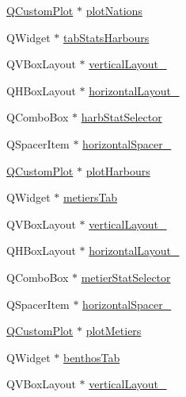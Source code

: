 \begin{DoxyCompactItemize}
\item 
\mbox{\hyperlink{class_q_custom_plot}{Q\+Custom\+Plot}} $\ast$ \mbox{\hyperlink{class_ui___main_window_a8273ab1fbab073c3df732499d91f9a22}{plot\+Nations}}
\item 
Q\+Widget $\ast$ \mbox{\hyperlink{class_ui___main_window_a337762b6a27f6a71e664db0a3bafe255}{tab\+Stats\+Harbours}}
\item 
Q\+V\+Box\+Layout $\ast$ \mbox{\hyperlink{class_ui___main_window_a7b66d5d6ab55f3977317359d09a42345}{vertical\+Layout\+\_}}
\item 
Q\+H\+Box\+Layout $\ast$ \mbox{\hyperlink{class_ui___main_window_a14c9d4842c3e97e16e7873ef0aecdb1e}{horizontal\+Layout\+\_}}
\item 
Q\+Combo\+Box $\ast$ \mbox{\hyperlink{class_ui___main_window_a054dd4b379083e22115ca77a49f6033f}{harb\+Stat\+Selector}}
\item 
Q\+Spacer\+Item $\ast$ \mbox{\hyperlink{class_ui___main_window_a3202b80ffde7629da626c1e0994f63f5}{horizontal\+Spacer\+\_}}
\item 
\mbox{\hyperlink{class_q_custom_plot}{Q\+Custom\+Plot}} $\ast$ \mbox{\hyperlink{class_ui___main_window_a2c53a619aa94f3c1dc10b2515076e2b5}{plot\+Harbours}}
\item 
Q\+Widget $\ast$ \mbox{\hyperlink{class_ui___main_window_a587e2428724df37bed7de8521f5fce51}{metiers\+Tab}}
\item 
Q\+V\+Box\+Layout $\ast$ \mbox{\hyperlink{class_ui___main_window_ab69a0ed5b8ea1148c5dda9b89cdfbba4}{vertical\+Layout\+\_}}
\item 
Q\+H\+Box\+Layout $\ast$ \mbox{\hyperlink{class_ui___main_window_a1351e317cba7ca711b6b4d2212b6bf36}{horizontal\+Layout\+\_}}
\item 
Q\+Combo\+Box $\ast$ \mbox{\hyperlink{class_ui___main_window_a9baf0c7353e58f10958d06a5adbfae3f}{metier\+Stat\+Selector}}
\item 
Q\+Spacer\+Item $\ast$ \mbox{\hyperlink{class_ui___main_window_acdff0826006698f82a7ef284f2950409}{horizontal\+Spacer\+\_}}
\item 
\mbox{\hyperlink{class_q_custom_plot}{Q\+Custom\+Plot}} $\ast$ \mbox{\hyperlink{class_ui___main_window_aa51fb9c06c845f9a8bb041fd607b4cd0}{plot\+Metiers}}
\item 
Q\+Widget $\ast$ \mbox{\hyperlink{class_ui___main_window_a3325ea901695aee89960c92ba0c27ac5}{benthos\+Tab}}
\item 
Q\+V\+Box\+Layout $\ast$ \mbox{\hyperlink{class_ui___main_window_afb6bb8ab195766b2b18cee42bcdc246b}{vertical\+Layout\+\_}}

\end{DoxyCompactItemize}
